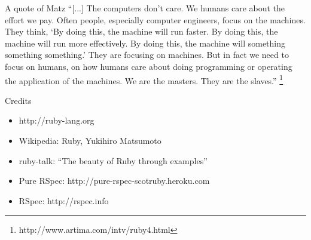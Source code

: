 \documentclass[10pt]{beamer}
\begin{document}
\begin{frame}{A quote of Matz}
``[...] The computers don't care. We humans care about the effort we pay. Often people, especially computer engineers, focus on the machines. They think, ‘By doing this, the machine will run faster. By doing this, the machine will run more effectively. By doing this, the machine will something something something.’ They are focusing on machines. But in fact we need to focus on humans, on how humans care about doing programming or operating the application of the machines. We are the masters. They are the slaves.'' \footnote{http://www.artima.com/intv/ruby4.html}
\end{frame}

\begin{frame}{Credits}
\begin{itemize}
	\item http://ruby-lang.org
	\item Wikipedia: Ruby, Yukihiro Matsumoto
	\item ruby-talk: ``The beauty of Ruby through examples''
	\item Pure RSpec: http://pure-rspec-scotruby.heroku.com
	\item RSpec: http://rspec.info
\end{itemize}
\end{frame}
\end{document}
